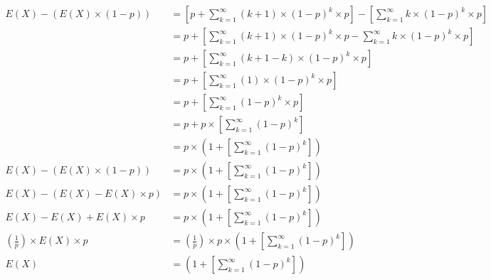 \documentclass[12pt]{article}
\begin{document}
\begin{equation}\label{ec22}
\begin{split}
E(X) - (E(X) \times (1-p)) &= [p + \sum_{k=1}^{\infty}{(k+1) \times (1 - p)^{k} \times p}] - [\sum_{k=1}^{\infty}{k \times (1 - p)^{k} \times p}]\\
&= p + [\sum_{k=1}^{\infty}{(k+1) \times (1 - p)^{k} \times p} - \sum_{k=1}^{\infty}{k \times (1 - p)^{k} \times p}]\\
&= p + [\sum_{k=1}^{\infty}{(k+1-k) \times (1 - p)^{k} \times p}]\\
&= p + [\sum_{k=1}^{\infty}{(1) \times (1 - p)^{k} \times p}]\\
&= p + [\sum_{k=1}^{\infty}{(1 - p)^{k} \times p}]\\
&= p +  p \times [\sum_{k=1}^{\infty}{(1 - p)^{k}}]\\
&= p \times(1 + [\sum_{k=1}^{\infty}{(1 - p)^{k}}])\\
E(X) - (E(X) \times (1-p)) &= p \times(1 + [\sum_{k=1}^{\infty}{(1 - p)^{k}}])\\
E(X) - (E(X) - E(X) \times p ) &= p \times(1 + [\sum_{k=1}^{\infty}{(1 - p)^{k}}])\\
E(X) - E(X) + E(X) \times p  &= p \times(1 + [\sum_{k=1}^{\infty}{(1 - p)^{k}}])\\
(\frac{1}{p}) \times E(X) \times p  &= (\frac{1}{p}) \times p \times(1 + [\sum_{k=1}^{\infty}{(1 - p)^{k}}])\\
E(X)  &= (1 + [\sum_{k=1}^{\infty}{(1 - p)^{k}}])\\
\end{split}
\end{equation}
\end{document}
